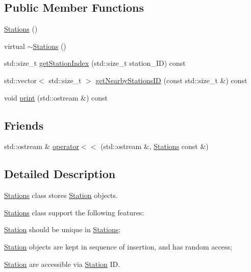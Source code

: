 \subsection*{Public Member Functions}
\begin{DoxyCompactItemize}
\item 
\mbox{\hyperlink{classanen_sta_1_1_stations_a4e0f8fc4709bd680154b7be896ca2350}{Stations}} ()
\item 
virtual \mbox{\hyperlink{classanen_sta_1_1_stations_a9d17c76f77babd7e88adf95112825b1d}{$\sim$\+Stations}} ()
\item 
std\+::size\+\_\+t \mbox{\hyperlink{classanen_sta_1_1_stations_af484bcbd06e625b31af987aa9b31316c}{get\+Station\+Index}} (std\+::size\+\_\+t station\+\_\+\+ID) const
\item 
std\+::vector$<$ std\+::size\+\_\+t $>$ \mbox{\hyperlink{classanen_sta_1_1_stations_ac9930469121ebb9b7f231a07666c4f82}{get\+Nearby\+Stations\+ID}} (const std\+::size\+\_\+t \&) const
\item 
void \mbox{\hyperlink{classanen_sta_1_1_stations_ae62b158dedf5f15c385671d15b950dc5}{print}} (std\+::ostream \&) const
\end{DoxyCompactItemize}
\subsection*{Friends}
\begin{DoxyCompactItemize}
\item 
std\+::ostream \& \mbox{\hyperlink{classanen_sta_1_1_stations_a6c2ba44849c083fa6d206d4573ea523e}{operator$<$$<$}} (std\+::ostream \&, \mbox{\hyperlink{classanen_sta_1_1_stations}{Stations}} const \&)
\end{DoxyCompactItemize}


\subsection{Detailed Description}
\mbox{\hyperlink{classanen_sta_1_1_stations}{Stations}} class stores \mbox{\hyperlink{classanen_sta_1_1_station}{Station}} objects. 

\mbox{\hyperlink{classanen_sta_1_1_stations}{Stations}} class support the following features\+:
\begin{DoxyEnumerate}
\item \mbox{\hyperlink{classanen_sta_1_1_station}{Station}} should be unique in \mbox{\hyperlink{classanen_sta_1_1_stations}{Stations}};
\item \mbox{\hyperlink{classanen_sta_1_1_station}{Station}} objects are kept in sequence of insertion, and has random access;
\item \mbox{\hyperlink{classanen_sta_1_1_station}{Station}} are accessible via \mbox{\hyperlink{classanen_sta_1_1_station}{Station}} ID. 
\end{DoxyEnumerate}

